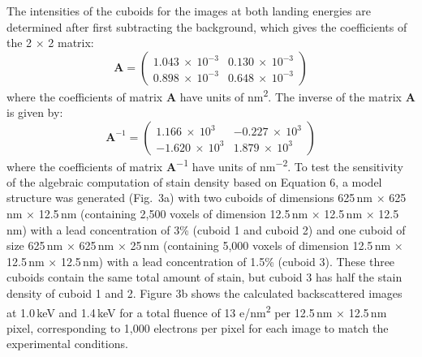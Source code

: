 \documentclass{article}
\begin{document}
The intensities of the cuboids for the images at both landing energies are determined after first subtracting the background, which gives the coefficients of the 2 × 2 matrix:
\begin{equation}
\mathbf{A} = \begin{pmatrix} 1.043\ \times\ 10^{-3} & 0.130\ \times\ 10^{-3}\\ 0.898\ \times\ 10^{-3} & 0.648\ \times\ 10^{-3} \end{pmatrix} \tag{7}
\end{equation}
where the coefficients of matrix \textbf{A} have units of nm\textsuperscript{2}. The inverse of the matrix \textbf{A} is given by:
\begin{equation}
\mathbf{A}^{-1} = \begin{pmatrix} 1.166\ \times\ 10^{3} & -0.227\ \times\ 10^{3}\\ -1.620\ \times\ 10^{3} & 1.879\ \times\ 10^{3} \end{pmatrix} \tag{8}
\end{equation}
where the coefficients of matrix \textbf{A}\textsuperscript{−1} have units of nm\textsuperscript{−2}. To test the sensitivity of the algebraic computation of stain density based on Equation 6, a model structure was generated (Fig.~3a) with two cuboids of dimensions 625\,nm × 625\,nm × 12.5\,nm (containing 2,500 voxels of dimension 12.5\,nm × 12.5\,nm × 12.5\,nm) with a lead concentration of 3\% (cuboid 1 and cuboid 2) and one cuboid of size 625\,nm × 625\,nm × 25\,nm (containing 5,000 voxels of dimension 12.5\,nm × 12.5\,nm × 12.5\,nm) with a lead concentration of 1.5\% (cuboid 3). These three cuboids contain the same total amount of stain, but cuboid 3 has half the stain density of cuboid 1 and 2. Figure 3b shows the calculated backscattered images at 1.0\,keV and 1.4\,keV for a total fluence of 13 e/nm\textsuperscript{2} per 12.5\,nm × 12.5\,nm pixel, corresponding to 1,000 electrons per pixel for each image to match the experimental conditions.
\end{document}
